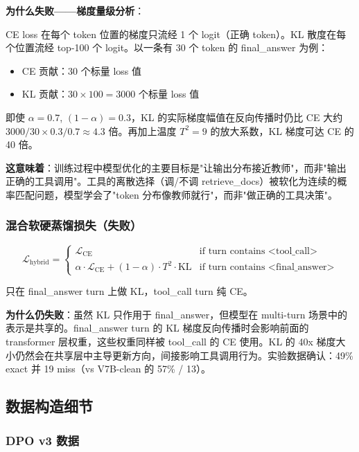 \documentclass[12pt,a4paper]{ctexart}
\begin{document}
\textbf{为什么失败——梯度量级分析}：

CE loss 在每个 token 位置的梯度只流经 1 个 logit（正确 token）。KL 散度在每个位置流经 top-100 个 logit。以一条有 30 个 token 的 final\_answer 为例：
\begin{itemize}[nosep]
  \item CE 贡献：30 个标量 loss 值
  \item KL 贡献：$30 \times 100 = 3000$ 个标量 loss 值
\end{itemize}

即使 $\alpha = 0.7$, $(1-\alpha) = 0.3$，KL 的实际梯度幅值在反向传播时仍比 CE 大约 $3000/30 \times 0.3/0.7 \approx 4.3$ 倍。再加上温度 $T^2 = 9$ 的放大系数，KL 梯度可达 CE 的 40 倍。

\textbf{这意味着}：训练过程中模型优化的主要目标是"让输出分布接近教师"，而非"输出正确的工具调用"。工具的离散选择（调/不调 retrieve\_docs）被软化为连续的概率匹配问题，模型学会了"token 分布像教师就行"，而非"做正确的工具决策"。

\subsubsection{混合软硬蒸馏损失（失败）}

$$\mathcal{L}_{\text{hybrid}} = \begin{cases}
\mathcal{L}_{\text{CE}} & \text{if turn contains <tool\_call>} \\
\alpha \cdot \mathcal{L}_{\text{CE}} + (1-\alpha) \cdot T^2 \cdot \text{KL} & \text{if turn contains <final\_answer>}
\end{cases}$$

只在 final\_answer turn 上做 KL，tool\_call turn 纯 CE。

\textbf{为什么仍失败}：虽然 KL 只作用于 final\_answer，但模型在 multi-turn 场景中的表示是共享的。final\_answer turn 的 KL 梯度反向传播时会影响前面的 transformer 层权重，这些权重同样被 tool\_call 的 CE 使用。KL 的 40x 梯度大小仍然会在共享层中主导更新方向，间接影响工具调用行为。实验数据确认：49\% exact 并 19 miss（vs V7B-clean 的 57\% / 13）。

\subsection{数据构造细节}

\subsubsection{DPO v3 数据}
\end{document}
